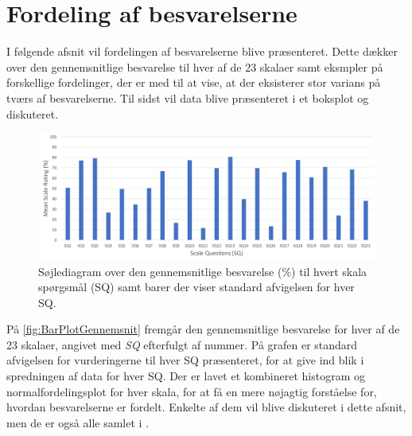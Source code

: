 \section{Fordeling af besvarelserne}
\label{TestAfSkalaFordeling}
%
%
I følgende afsnit vil fordelingen af besvarelserne blive præsenteret. Dette dækker over den gennemsnitlige besvarelse til hver af de 23 skalaer samt eksmpler på forskellige fordelinger, der er med til at vise, at der eksisterer stor varians på tværs af besvarelserne. Til sidst vil data blive præsenteret i et boksplot og diskuteret.
%
\begin{figure}[H]
\centering
\includegraphics[width = \textwidth]{Figure/DatabehandlingSkalaer/DataPresentation/MeanBarplot} 
 \caption{Søjlediagram over den gennemsnitlige besvarelse (\%) til hvert skala spørgsmål (SQ) samt barer der viser standard afvigelsen for hver SQ.}
\label{fig:BarPlotGennemsnit}
\end{figure}
\noindent
%
På \autoref{fig:BarPlotGennemsnit} fremgår den gennemsnitlige besvarelse for hver af de 23 skalaer, angivet med \textit{SQ} efterfulgt af nummer. På grafen er standard afvigelsen for vurderingerne til hver SQ præsenteret, for at give ind blik i spredningen af data for hver SQ. \blankline
%
Der er lavet et kombineret histogram og normalfordelingsplot for hver skala, for at få en mere nøjagtig forståelse for, hvordan besvarelserne er fordelt. Enkelte af dem vil blive diskuteret i dette afsnit, men de er også alle samlet i .

